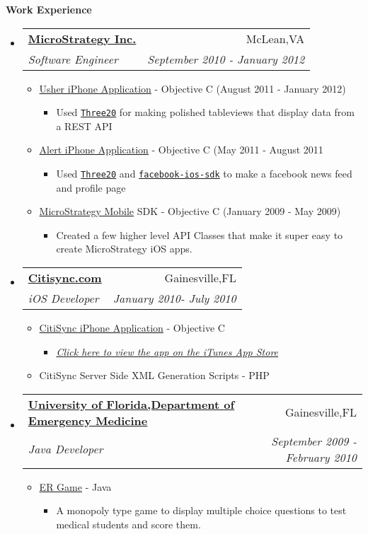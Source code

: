\documentclass[letterpaper,11pt]{article}
\makeatletter
\newcommand{\resitem}[1]{\item #1 \vspace{-2pt}}
\newcommand{\resheading}[1]{{\large \colorbox{mygrey}{\begin{minipage}{\textwidth}{\textbf{#1 \vphantom{p\^{E}}}}\end{minipage}}}}
\newcommand{\ressubheading}[4]{
\begin{tabular*}{7.0in}{l@{\extracolsep{\fill}}r}
		\textbf{#1} & #2 \\
		\textit{#3} & \textit{#4} \\
\end{tabular*}\vspace{-6pt}}
\makeatother
\begin{document}
\resheading{Work Experience}
\begin{itemize}
\item
    \ressubheading{\href{http://www.microstrategy.com/Company}{MicroStrategy Inc.}}{McLean,VA}{Software Engineer}{September 2010 - January 2012}
    \begin{itemize}
        \resitem{\href{http://itunes.apple.com/us/app/usher-by-microstrategy/id477543403}{Usher iPhone Application} - Objective C (August 2011 - January 2012)}
        \begin{itemize}
            \resitem{Used \href{http://github.com/facebook/three20}{\texttt{Three20}} for making polished tableviews that display data from a REST API}
        \end{itemize}
        \resitem{\href{http://itunes.apple.com/us/app/alert-for-iphone/id442981988?mt=8&ls=1}{Alert iPhone Application} - Objective C (May 2011 - August 2011}
        \begin{itemize}
            \resitem{Used \href{http://github.com/facebook/three20}{\texttt{Three20}}  and  \href{https://github.com/facebook/facebook-ios-sdk}{\texttt{facebook-ios-sdk}} to make a facebook news feed and profile page}
        \end{itemize}
        \resitem{ \href{http://www.microstrategy.com/mobile/}{MicroStrategy Mobile} SDK - Objective C (January 2009 - May 2009)}
        \begin{itemize}
            \resitem{Created a few higher level API Classes that make it super easy to create MicroStrategy iOS apps.}
        \end{itemize}
    \end{itemize}

\item
    \ressubheading{\href{http://citisync.com}{Citisync.com}}{Gainesville,FL}{iOS Developer}{January 2010- July 2010}
    \begin{itemize}
        \resitem{\href{http://citisync.com/iphone}{CitiSync iPhone Application} - Objective C}
        \begin{itemize}
            \resitem{\href{http://itunes.apple.com/us/app/citisync/id387136606?mt=8}{\emph{Click here to view the app on the iTunes App Store}}}
        \end{itemize}
        \resitem{CitiSync Server Side XML Generation Scripts - PHP}
    \end{itemize}

\item
    \ressubheading{\href{http://emergency.med.ufl.edu}{University of Florida,Department of Emergency Medicine}}{Gainesville,FL}{Java Developer}{September 2009 - February 2010}
    \begin{itemize}
        \resitem{\href{http://onlinelibrary.wiley.com/doi/10.1111/j.1553-2712.2009.00392_16.x/abstract}{ER Game} - Java}
        \begin{itemize}
            \resitem{A monopoly type game to display multiple choice questions to test medical students and score them.}
        \end{itemize}
    \end{itemize}
                

\end{itemize}
\end{document}
